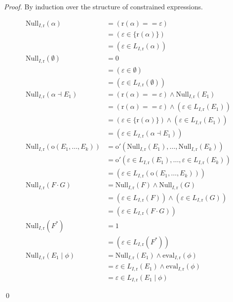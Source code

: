 \documentclass[a4paper]{llncs}
\begin{document}
  \begin{proof}
    By induction over the structure of constrained expressions.
      \begin{multicols}{2}
        \begin{align*}
          \mathrm{Null}_{I,\mathrm{r}}(\alpha)&=(\mathrm{r}(\alpha)==\varepsilon)\\
          & =(\varepsilon\in \{\mathrm{r}(\alpha)\})\\
          &=(\varepsilon\in L_{I,\mathrm{r}}(\alpha))\\
          \mathrm{Null}_{I,\mathrm{r}}(\emptyset)&=0\\
          &=(\varepsilon\in \emptyset)\\
          &=(\varepsilon\in L_{I,\mathrm{r}}(\emptyset))\\
          \mathrm{Null}_{I,\mathrm{r}}(\alpha\dashv E_1) & =(\mathrm{r}(\alpha)==\varepsilon)\wedge \mathrm{Null}_{I,\mathrm{r}}(E_1)\\
          &  =(\mathrm{r}(\alpha)==\varepsilon)\wedge (\varepsilon\in L_{I,\mathrm{r}}(E_1))\\
          &  =(\varepsilon\in\{\mathrm{r}(\alpha)\})\wedge (\varepsilon\in L_{I,\mathrm{r}}(E_1))\\
          & =(\varepsilon\in L_{I,\mathrm{r}}(\alpha\dashv E_1))\\
          \mathrm{Null}_{I,\mathrm{r}}(\mathrm{o}(E_1,\ldots,E_k)) & =\mathrm{o}'(\mathrm{Null}_{I,\mathrm{r}}(E_1),\ldots,\mathrm{Null}_{I,\mathrm{r}}(E_k))\\
      & =\mathrm{o}'(\varepsilon\in L_{I,\mathrm{r}}(E_1),\ldots,\varepsilon\in L_{I,\mathrm{r}}(E_k))\\
      & =(\varepsilon \in L_{I,\mathrm{r}}(\mathrm{o}(E_1,\ldots,E_k)) )\\
      \mathrm{Null}_{I,\mathrm{r}}(F\cdot G) & =\mathrm{Null}_{I,\mathrm{r}}(F)\wedge \mathrm{Null}_{I,\mathrm{r}}(G)\\
      & =(\varepsilon\in L_{I,\mathrm{r}}(F))\wedge (\varepsilon\in L_{I,\mathrm{r}}(G))\\
      & =(\varepsilon\in L_{I,\mathrm{r}}(F\cdot G))\\
      \mathrm{Null}_{I,\mathrm{r}}(F^*)&=1\\
      &=(\varepsilon\in L_{I,\mathrm{r}}(F^*))\\
      \mathrm{Null}_{I,\mathrm{r}}(E_1\mid \phi) & =\mathrm{Null}_{I,\mathrm{r}}(E_1)\wedge \mathrm{eval}_{I,\mathrm{r}}(\phi)\\ 
      & =\varepsilon\in L_{I,\mathrm{r}}(E_1) \wedge \mathrm{eval}_{I,\mathrm{r}}(\phi)\\
      & =\varepsilon\in L_{I,\mathrm{r}}(E_1\mid\phi)
        \end{align*}
      \end{multicols}
    \qed
  \end{proof}
  
\end{document}
